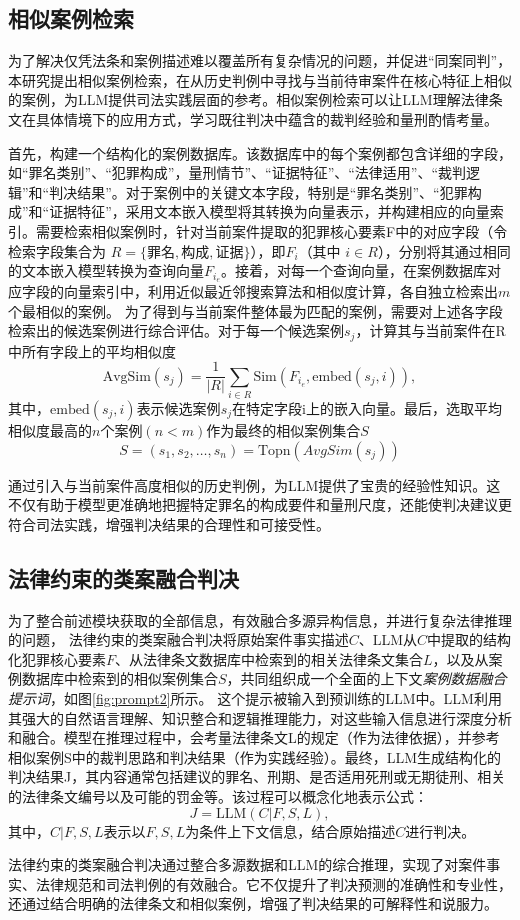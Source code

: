 \subsection{\heiti 相似案例检索}
为了解决仅凭法条和案例描述难以覆盖所有复杂情况的问题，并促进“同案同判”， 本研究提出相似案例检索，在从历史判例中寻找与当前待审案件在核心特征上相似的案例，为LLM提供司法实践层面的参考。相似案例检索可以让LLM理解法律条文在具体情境下的应用方式，学习既往判决中蕴含的裁判经验和量刑酌情考量。

首先，构建一个结构化的案例数据库。该数据库中的每个案例都包含详细的字段，如“罪名类别”、“犯罪构成”，量刑情节”、“证据特征”、“法律适用”、“裁判逻辑”和“判决结果”。对于案例中的关键文本字段，特别是“罪名类别”、“犯罪构成”和“证据特征”，采用文本嵌入模型将其转换为向量表示，并构建相应的向量索引。需要检索相似案例时，针对当前案件提取的犯罪核心要素F中的对应字段（令检索字段集合为 $R=\{\text{罪名},\text{构成},\text{证据}\}$），即$F_{i}$​（其中 $i \in R$），分别将其通过相同的文本嵌入模型转换为查询向量$F_{i_e}$。接着，对每一个查询向量，在案例数据库对应字段的向量索引中，利用近似最近邻搜索算法和相似度计算，各自独立检索出$m$个最相似的案例。
为了得到与当前案件整体最为匹配的案例，需要对上述各字段检索出的候选案例进行综合评估。对于每一个候选案例$s_j$​，计算其与当前案件在R中所有字段上的平均相似度
{
\small
\begin{equation}
    \text{AvgSim}(s_j) = \frac{1}{|R|} \sum_{i \in R} \text{Sim}\left( F_{i_e}, \text{embed}(s_j, i) \right),
\end{equation}
}
其中，$\text{embed}(s_j,i)$表示候选案例$s_j$​在特定字段$\text{i}$上的嵌入向量。最后，选取平均相似度最高的$n$个案例$(n<m)$作为最终的相似案例集合$S$
\begin{equation}
	S=(s_1​,s_2​,\dots,s_n​)=\text{Topn​}(AvgSim(s_j​))
\end{equation}

通过引入与当前案件高度相似的历史判例，为LLM提供了宝贵的经验性知识。这不仅有助于模型更准确地把握特定罪名的构成要件和量刑尺度，还能使判决建议更符合司法实践，增强判决结果的合理性和可接受性。

\subsection{\heiti 法律约束的类案融合判决}

为了整合前述模块获取的全部信息，有效融合多源异构信息，并进行复杂法律推理的问题， 法律约束的类案融合判决将原始案件事实描述$C$、LLM从$C$中提取的结构化犯罪核心要素$F$、从法律条文数据库中检索到的相关法律条文集合$L$，以及从案例数据库中检索到的相似案例集合$S$，共同组织成一个全面的上下文\textit{案例数据融合提示词}，如图\ref{fig:prompt2}所示。
这个提示被输入到预训练的LLM中。LLM利用其强大的自然语言理解、知识整合和逻辑推理能力，对这些输入信息进行深度分析和融合。模型在推理过程中，会考量法律条文L的规定（作为法律依据），并参考相似案例S中的裁判思路和判决结果（作为实践经验）。最终，LLM生成结构化的判决结果J，其内容通常包括建议的罪名、刑期、是否适用死刑或无期徒刑、相关的法律条文编号以及可能的罚金等。该过程可以概念化地表示公式：
\begin{equation}
	J=\text{LLM}(C|F,S,L),
\end{equation}
其中，$C | F,S,L $表示以$F,S,L$为条件上下文信息，结合原始描述$C$进行判决。

法律约束的类案融合判决通过整合多源数据和LLM的综合推理，实现了对案件事实、法律规范和司法判例的有效融合。它不仅提升了判决预测的准确性和专业性，还通过结合明确的法律条文和相似案例，增强了判决结果的可解释性和说服力。
